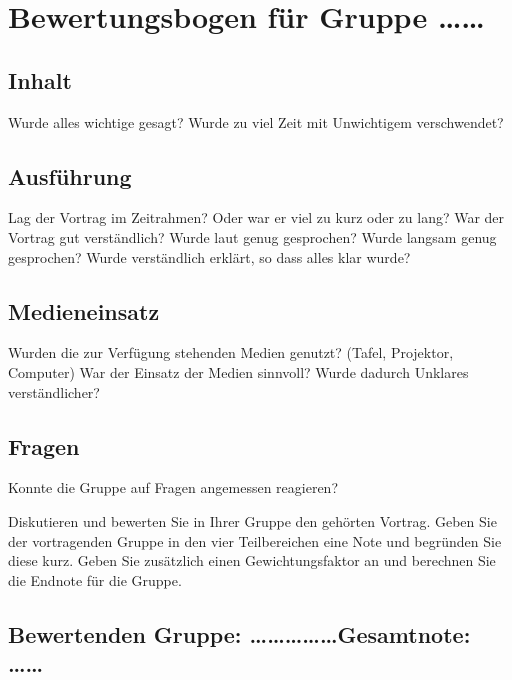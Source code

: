 \documentclass[11pt,a5paper]{article}
\date{}
\begin{document}
\thispagestyle{empty}

\section*{Bewertungsbogen für Gruppe \ldots\ldots}

\subsection*{Inhalt} 
Wurde alles wichtige gesagt?
Wurde zu viel Zeit mit Unwichtigem verschwendet?

\subsection*{Ausführung}
Lag der Vortrag im Zeitrahmen? Oder war er viel zu kurz oder zu lang?
War der Vortrag gut verständlich? Wurde laut genug gesprochen? Wurde langsam genug gesprochen?
Wurde verständlich erklärt, so dass alles klar wurde?

\subsection*{Medieneinsatz}
Wurden die zur Verfügung stehenden Medien genutzt? (Tafel, Projektor, Computer)
War der Einsatz der Medien sinnvoll? Wurde dadurch Unklares verständlicher?

\subsection*{Fragen}
Konnte die Gruppe auf Fragen angemessen reagieren?


Diskutieren und bewerten Sie in Ihrer Gruppe den gehörten Vortrag.
Geben Sie der vortragenden Gruppe in den vier Teilbereichen eine Note und begründen Sie diese kurz.
Geben Sie zusätzlich einen Gewichtungsfaktor an und berechnen Sie die Endnote für die Gruppe.

\subsection*{Bewertenden Gruppe: \ldots\ldots\ldots\ldots\ldots Gesamtnote: \ldots\ldots}
\end{document}
